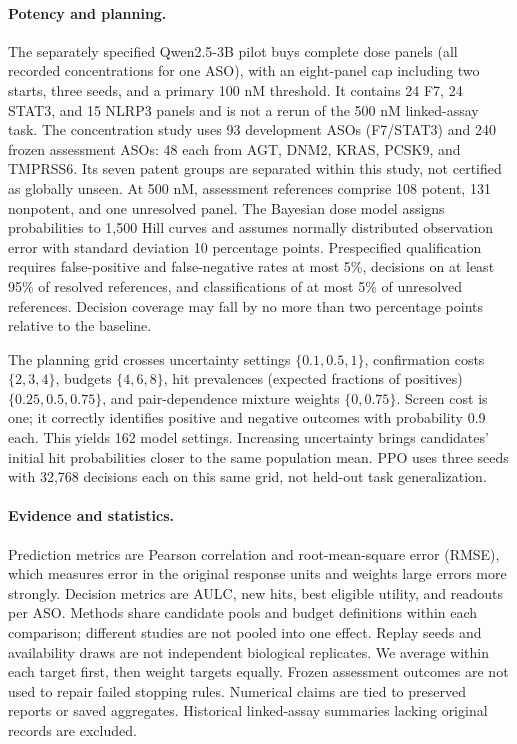 \documentclass[letterpaper]{article}
\begin{document}
\paragraph{Potency and planning.}
The separately specified Qwen2.5-3B pilot buys complete dose panels (all recorded concentrations for one ASO), with an eight-panel cap including two starts, three seeds, and a primary 100 nM threshold. It contains 24 F7, 24 STAT3, and 15 NLRP3 panels and is not a rerun of the 500 nM linked-assay task. The concentration study uses 93 development ASOs (F7/STAT3) and 240 frozen assessment ASOs: 48 each from AGT, DNM2, KRAS, PCSK9, and TMPRSS6. Its seven patent groups are separated within this study, not certified as globally unseen. At 500 nM, assessment references comprise 108 potent, 131 nonpotent, and one unresolved panel. The Bayesian dose model assigns probabilities to 1,500 Hill curves and assumes normally distributed observation error with standard deviation 10 percentage points. Prespecified qualification requires false-positive and false-negative rates at most 5\%, decisions on at least 95\% of resolved references, and classifications of at most 5\% of unresolved references. Decision coverage may fall by no more than two percentage points relative to the baseline.

The planning grid crosses uncertainty settings $\{0.1,0.5,1\}$, confirmation costs $\{2,3,4\}$, budgets $\{4,6,8\}$, hit prevalences (expected fractions of positives) $\{0.25,0.5,0.75\}$, and pair-dependence mixture weights $\{0,0.75\}$. Screen cost is one; it correctly identifies positive and negative outcomes with probability 0.9 each. This yields 162 model settings. Increasing uncertainty brings candidates' initial hit probabilities closer to the same population mean. PPO uses three seeds with 32,768 decisions each on this same grid, not held-out task generalization.

\paragraph{Evidence and statistics.}
Prediction metrics are Pearson correlation and root-mean-square error (RMSE), which measures error in the original response units and weights large errors more strongly. Decision metrics are AULC, new hits, best eligible utility, and readouts per ASO. Methods share candidate pools and budget definitions within each comparison; different studies are not pooled into one effect. Replay seeds and availability draws are not independent biological replicates. We average within each target first, then weight targets equally. Frozen assessment outcomes are not used to repair failed stopping rules. Numerical claims are tied to preserved reports or saved aggregates. Historical linked-assay summaries lacking original records are excluded.
\end{document}
